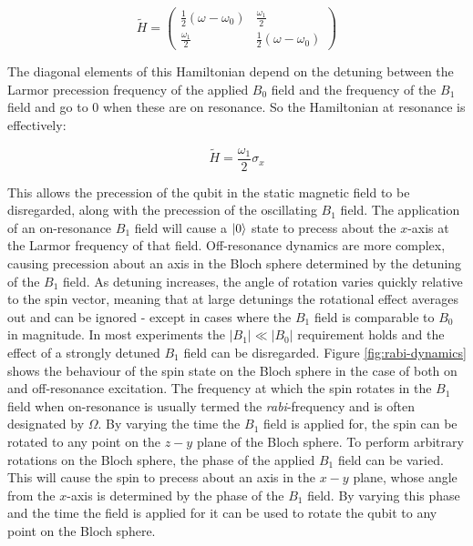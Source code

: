 \begin{equation}
  \tilde{H} =
  \begin{pmatrix}
    \frac{1}{2}(\omega - \omega_0) & \frac{\omega_1}{2} \\
    \frac{\omega_1}{2} & \frac{1}{2}(\omega - \omega_0)
  \end{pmatrix}
\end{equation}

The diagonal elements of this Hamiltonian depend on the detuning between the Larmor precession frequency of the applied $B_0$ field and the frequency of the $B_1$ field and go to 0 when these are on resonance. So the Hamiltonian at resonance is effectively:

\begin{equation}
  \tilde{H} = \frac{\omega_1}{2} \sigma_x
\end{equation}


This allows the precession of the qubit in the static magnetic field to be disregarded, along with the precession of the oscillating $B_1$ field. The application of an on-resonance $B_1$ field will cause a $\ket{0}$ state to precess about the $x$-axis at the Larmor frequency of that field. Off-resonance dynamics are more complex, causing precession about an axis in the Bloch sphere determined by the detuning of the $B_1$ field. As detuning increases, the angle of rotation varies quickly relative to the spin vector, meaning that at large detunings the rotational effect averages out and can be ignored - except in cases where the $B_1$ field is comparable to $B_0$ in magnitude. In most experiments the $|B_1| \ll |B_0|$ requirement holds and the effect of a strongly detuned $B_1$ field can be disregarded. Figure \ref{fig:rabi-dynamics} shows the behaviour of the spin state on the Bloch sphere in the case of both on and off-resonance excitation. The frequency at which the spin rotates in the $B_1$ field when on-resonance is usually termed the \emph{rabi}-frequency and is often designated by $\Omega$. By varying the time the $B_1$ field is applied for, the spin can be rotated to any point on the $z-y$ plane of the Bloch sphere. To perform arbitrary rotations on the Bloch sphere, the phase of the applied $B_1$ field can be varied. This will cause the spin to precess about an axis in the $x-y$ plane, whose angle from the $x$-axis is determined by the phase of the $B_1$ field. By varying this phase and the time the field is applied for it can be used to rotate the qubit to any point on the Bloch sphere.



